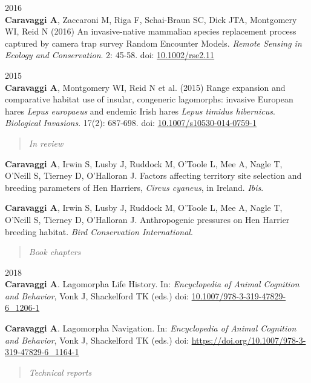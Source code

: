 \documentclass[]{article}
\begin{document}
2016\\
\textbf{Caravaggi A}, Zaccaroni M, Riga F, Schai-Braun SC, Dick JTA,
Montgomery WI, Reid N (2016) An invasive-native mammalian species
replacement process captured by camera trap survey Random Encounter
Models. \emph{Remote Sensing in Ecology and Conservation}. 2: 45-58.
doi:
\href{http://onlinelibrary.wiley.com/doi/10.1002/rse2.11/abstract}{10.1002/rse2.11}

2015\\
\textbf{Caravaggi A}, Montgomery WI, Reid N et al. (2015) Range
expansion and comparative habitat use of insular, congeneric lagomorphs:
invasive European hares \emph{Lepus europaeus} and endemic Irish hares
\emph{Lepus timidus hibernicus}. \emph{Biological Invasions}. 17(2):
687-698. doi:
\href{http://link.springer.com/article/10.1007/s10530-014-0759-1}{10.1007/s10530-014-0759-1}

\begin{quote}
\emph{In review}
\end{quote}

\textbf{Caravaggi A}, Irwin S, Lusby J, Ruddock M, O'Toole L, Mee A,
Nagle T, O'Neill S, Tierney D, O'Halloran J. Factors affecting territory
site selection and breeding parameters of Hen Harriers, \emph{Circus
cyaneus}, in Ireland. \emph{Ibis}.

\textbf{Caravaggi A}, Irwin S, Lusby J, Ruddock M, O'Toole L, Mee A,
Nagle T, O'Neill S, Tierney D, O'Halloran J. Anthropogenic pressures on
Hen Harrier breeding habitat. \emph{Bird Conservation International}.

\begin{quote}
\emph{Book chapters}
\end{quote}

2018\\
\textbf{Caravaggi A}. Lagomorpha Life History. In: \emph{Encyclopedia of
Animal Cognition and Behavior}, Vonk J, Shackelford TK (eds.) doi:
\href{https://link.springer.com/referenceworkentry/10.1007/978-3-319-47829-6_1206-1}{10.1007/978-3-319-47829-6\_1206-1}

\textbf{Caravaggi A}. Lagomorpha Navigation. In: \emph{Encyclopedia of
Animal Cognition and Behavior}, Vonk J, Shackelford TK (eds.) doi:
\href{https://link.springer.com/referenceworkentry/10.1007/978-3-319-47829-6_1164-1}{https://doi.org/10.1007/978-3-319-47829-6\_1164-1}

\begin{quote}
\emph{Technical reports}
\end{quote}
\end{document}
